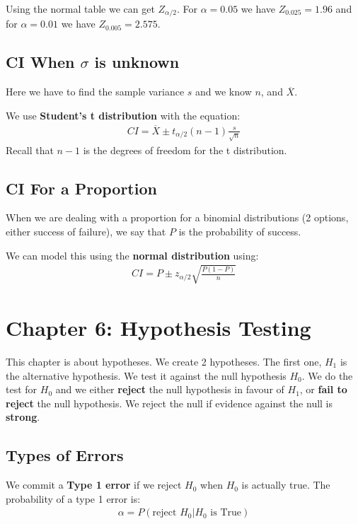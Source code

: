 \documentclass[12pt,letterpaper]{article} \usepackage{amsmath} \usepackage{graphicx} \usepackage[margin=1in]{geometry} \usepackage{longtable}  \usepackage{amssymb}
\begin{document}
	Using the normal table we can get $Z_{\alpha/2}$. For $\alpha = 0.05$ we have $Z_{0.025} = 1.96$ and for $\alpha = 0.01$ we have $Z_{0.005} = 2.575$.
	
	\subsection{CI When $\sigma$ is unknown}
	Here we have to find the sample variance $s$ and we know $n$, and $\overline X$.
	
	We use \textbf{Student's t distribution} with the equation:
	\begin{align*}
		CI = \overline X \pm t_{\alpha/2}(n-1) \frac{s}{\sqrt n}
	\end{align*}
	Recall that $n-1$ is the degrees of freedom for the t distribution.
	
	\subsection{CI For a Proportion}
	When we are dealing with a proportion for a binomial distributions (2 options, either success of failure), we say that $P$ is the probability of success. 
	
	We can model this using the \textbf{normal distribution} using:
	\begin{align*}
		CI = P \pm z_{\alpha/2} \sqrt{\frac{P(1-P)}{n}}
	\end{align*}

	\section{Chapter 6: Hypothesis Testing}
	This chapter is about hypotheses. We create 2 hypotheses. The first one, $H_1$ is the alternative hypothesis. We test it against the null hypothesis $H_0$. We do the test for $H_0$ and we either \textbf{reject} the null hypothesis in favour of $H_1$, or \textbf{fail to reject} the null hypothesis. We reject the null if evidence against the null is \textbf{strong}.
	
	\subsection{Types of Errors}
	
	We commit a \textbf{Type 1 error} if we reject $H_0$ when $H_0$ is actually true. The probability of a type 1 error is:
	\begin{align*}
		\alpha = P(\text{reject }H_0 | H_0\text{ is True})
	\end{align*}
	
\end{document}

